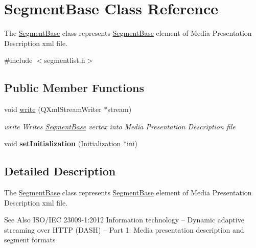 \hypertarget{class_segment_base}{\section{Segment\-Base Class Reference}
\label{class_segment_base}
}


The \hyperlink{class_segment_base}{Segment\-Base} class represents \hyperlink{class_segment_base}{Segment\-Base} element of Media Presentation Description xml file.  




{\ttfamily \#include $<$segmentlist.\-h$>$}

\subsection*{Public Member Functions}
\begin{DoxyCompactItemize}
\item 
void \hyperlink{class_segment_base_a62a316d412de52dab7564e104afe53d0}{write} (Q\-Xml\-Stream\-Writer $\ast$stream)
\begin{DoxyCompactList}\small\item\em write Writes \hyperlink{class_segment_base}{Segment\-Base} vertex into Media Presentation Description file \end{DoxyCompactList}\item 
\hypertarget{class_segment_base_a1e22fe04146793fb5f47ed6f92fe7bc0}{void {\bfseries set\-Initialization} (\hyperlink{class_initialization}{Initialization} $\ast$ini)}\label{class_segment_base_a1e22fe04146793fb5f47ed6f92fe7bc0}

\end{DoxyCompactItemize}


\subsection{Detailed Description}
The \hyperlink{class_segment_base}{Segment\-Base} class represents \hyperlink{class_segment_base}{Segment\-Base} element of Media Presentation Description xml file. 

\begin{DoxySeeAlso}{See Also}
I\-S\-O/\-I\-E\-C 23009-\/1\-:2012 Information technology – Dynamic adaptive streaming over H\-T\-T\-P (D\-A\-S\-H) – Part 1\-: Media presentation description and segment formats 
\end{DoxySeeAlso}


